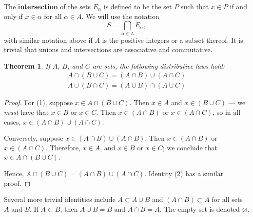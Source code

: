 \documentclass[11pt]{article}
\newtheorem{theorem}{Theorem}
\begin{document}
The \textbf{intersection} of the sets $E_{\alpha}$ is defined to be the set $P$ such that $x \in P$ if and only if $x \in \alpha$ for all $\alpha \in A$. We will use the notation
\[
	S = \bigcap\limits_{\alpha \in A} E_{\alpha},
\]
with similar notation above if $A$ is the positive integers or a subset thereof. It is trivial that unions and intersections are associative and commutative.

\begin{theorem}
	If $A$, $B$, and $C$ are sets, the following distributive laws hold:
	\begin{align}
		A \cap (B \cup C) = (A \cap B) \cup (A \cap C) \\
		A \cup (B \cap C) = (A \cup B) \cap (A \cup C)
	\end{align}
\end{theorem}
\begin{adjustwidth}{1cm}{}
	\begin{proof}
		For (1), suppose $x \in A \cap (B \cup C)$. Then $x \in A$ and $x \in (B \cup C)$ --- we \textit{must} have that $x \in B$ or $x \in C$. Then $x \in (A \cap B)$ or $x \in (A \cap C)$, so in all cases, $x \in (A \cap B) \cup (A \cap C)$.

		Conversely, suppose $x \in (A \cap B) \cup (A \cap B)$. Then $x \in (A \cap B)$ or $x \in (A \cap C)$. Therefore, $x \in A$, and $x \in B$ or $x \in C$; we conclude that $x \in A \cap (B \cup C)$.

		Hence, $A \cap (B \cup C) = (A \cap B) \cup (A \cap C)$. Identity (2) has a similar proof.
	\end{proof}
\end{adjustwidth}
Several more trivial identities include $A \subset A \cup B$ and $(A \cap B) \subset A$ for all sets $A$ and $B$. If $A \subset B$, then $A \cup B = B$ and $A \cap B = A$. The empty set is denoted $\varnothing$.

\newpage
\end{document}
